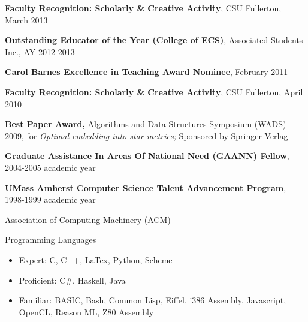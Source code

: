 \documentclass[11pt]{letter}
\begin{document}
\textbf{Faculty Recognition: Scholarly \& Creative Activity}, CSU Fullerton, March 2013

\textbf{Outstanding Educator of the Year (College of ECS)}, Associated Students Inc., AY 2012-2013

\textbf{Carol Barnes Excellence in Teaching Award Nominee}, February 2011

\textbf{Faculty Recognition: Scholarly \& Creative Activity}, CSU Fullerton, April 2010

\textbf{Best Paper Award,} Algorithms and Data Structures Symposium (WADS) 2009, for \emph{Optimal embedding into star metrics;} Sponsored by Springer Verlag

\textbf{Graduate Assistance In Areas Of National Need (GAANN) Fellow}, 2004-2005 academic year

\textbf{UMass Amherst Computer Science Talent Advancement Program}, 1998-1999 academic year


Association of Computing Machinery (ACM) \\


Programming Languages
\begin{itemize}
\item Expert: C, C++, LaTex, Python, Scheme
\item Proficient: C\#, Haskell, Java
\item Familiar: BASIC, Bash, Common Lisp, Eiffel, i386 Assembly, Javascript, OpenCL, Reason ML, Z80 Assembly
\end{itemize}
\end{document}
